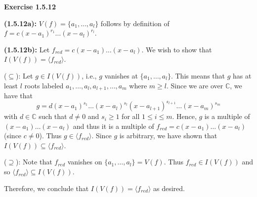\documentclass[12pt,oneside]{article}
\newenvironment{exercise}[1]{\vspace{.1in}\noindent\textbf{Exercise #1 \hspace{.05em}}}{}
\newcommand{\C}{\mathbb{C}}
\begin{document}

\begin{exercise}{1.5.12}

    \bigskip
    \textbf{(1.5.12a):} $V(f) = \{a_1,\ldots,a_l\}$ follows by definition of $f = c(x-a_1)^{r_1}\ldots (x-a_l)^{r_l}$.

    \bigskip
    \textbf{(1.5.12b):} Let $f_{red} = c(x-a_1)\ldots(x-a_l)$. We wish to show 
    that $I(V(f)) = \langle f_{red} \rangle$.

    \bigskip
    ($\subseteq$): Let $g \in I(V(f))$, i.e., $g$ vanishes at $\{a_1,\ldots,a_l\}$.
    This means that $g$ has at least $l$ roots labeled $a_1,\ldots,a_l,a_{l+1},\ldots,a_m$
    where $m \geq l$. Since we are over $\C$, we have that 
    \[
        g=d(x-a_1)^{s_1}\ldots(x-a_l)^{s_l}(x-a_{l+1})^{s_{l+1}}\ldots(x-a_m)^{s_m}
    \]
    with $d \in \C$ such that $d \neq 0$ and $s_i \geq 1$ for all $1\leq i \leq m$.
    Hence, $g$ is a multiple of $(x-a_1)\ldots(x-a_l)$ and thus it is a multiple 
    of $f_{red} = c(x-a_1)\ldots(x-a_l)$ (since $c \neq 0$). Thus $g \in \langle f_{red} \rangle$.
    Since $g$ is arbitrary, we have shown that $I(V(f)) \subseteq \langle f_{red} \rangle$.
   
    \bigskip
    ($\supseteq$): Note that $f_{red}$ 
    vanishes on $\{a_1,\ldots,a_l\} = V(f)$. Thus $f_{red} \in I(V(f))$ and 
    so $\langle f_{red} \rangle \subseteq I(V(f))$. 

    Therefore, we conclude that $I(V(f)) = \langle f_{red} \rangle$ as desired.
\end{exercise}


\end{document}
